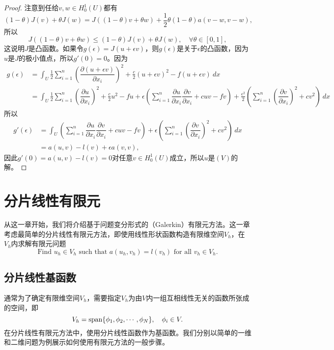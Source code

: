 \documentclass[a4paper,10pt]{ctexart}
\begin{document}
\begin{proof}
    注意到任给$ v,w\in H^1_0(U) $都有
    \[
        (1-\theta)J(v)+\theta J(w) = J((1-\theta)v+\theta w) + \frac{1}{2}\theta(1-\theta)a(v-w,v-w),
    \]
    所以
    \[
        J((1-\theta)v+\theta w) \leqslant (1-\theta)J(v)+\theta J(w),\quad \forall \theta\in [0,1],
    \]
    这说明$ J $是凸函数。如果令$ g(\epsilon) = J(u+\epsilon v) $，则$ g(\epsilon) $是关于$ \epsilon $的凸函数，因为$ u $是$ J $的极小值点，所以$ g'(0) = 0 $。因为
    \[
        \begin{aligned}
            g(\epsilon) 
            &= \int_U \frac{1}{2}\sum_{i=1}^n(\dfrac{\partial (u+\epsilon v)}{\partial x_i} )^2 +\frac{c}{2}(u+\epsilon v)^2 - f(u+\epsilon v)\ dx\\
            &= \int_U \frac{1}{2}\sum_{i=1}^n(\dfrac{\partial u}{\partial x_i})^2 +\frac{c}{2}u^2 -fu + \epsilon \left( \sum_{i=1}^n\dfrac{\partial u}{\partial x_i}\dfrac{\partial v}{\partial x_i} +cuv-fv \right)  + \frac{\epsilon^2}{2}\left( \sum_{i=1}^n(\dfrac{\partial v}{\partial x_i} )^2+c v^2 \right) \ dx
        \end{aligned}
    \]
    所以
    \[
        \begin{aligned}
            g'(\epsilon) 
            &= \int_U \left( \sum_{i=1}^n\dfrac{\partial u}{\partial x_i}\dfrac{\partial v}{\partial x_i} +cuv-fv \right)  + \epsilon\left( \sum_{i=1}^n(\dfrac{\partial v}{\partial x_i} )^2+c v^2 \right) \ dx\\
            &= a(u,v) - l(v) + \epsilon a(v,v),
        \end{aligned}
    \]
    因此$ g'(0) = a(u,v) - l(v) = 0 $对任意$ v\in H^1_0(U) $成立，所以$ u $是$ (V) $的解。
\end{proof}

\section{分片线性有限元}
从这一章开始，我们将介绍基于问题变分形式的（Galerkin）有限元方法。这一章考虑最简单的分片线性有限元方法，即使用线性形状函数构造有限维空间$ V_h $，在$ V_h $内求解有限元问题
\begin{equation}
    \text{Find } u_h \in V_h \text{ such that } a(u_h,v_h) = l(v_h) \text{ for all } v_h \in V_h.
\end{equation}
\subsection{分片线性基函数}
通常为了确定有限维空间$ V_h $，需要指定$ V_h $为由$ V $内一组互相线性无关的函数所张成的空间，即
\begin{equation}
    V_h = {\rm span}\{\phi_1,\phi_2,\cdots ,\phi_N\},\quad \phi_i\in V.
\end{equation}
在分片线性有限元方法中，使用分片线性函数作为基函数。我们分别以简单的一维和二维问题为例展示如何使用有限元方法的一般步骤。
\end{document}
